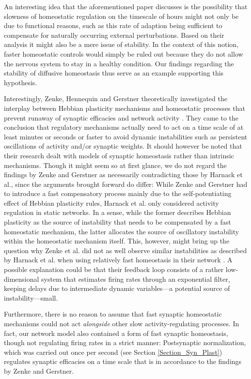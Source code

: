 \documentclass[10pt,a4paper]{article}
\begin{document}
An interesting idea that the aforementioned paper discusses is the possibility that slowness of homeostatic regulation on the timescale of hours might not only be due to functional reasons, such as this rate of adaption being sufficient to compensate for naturally occurring external perturbations. Based on their analysis it might also be a mere issue of stability. In the context of this notion, faster homeostatic controls would simply be ruled out because they do not allow the nervous system to stay in a healthy condition. Our findings regarding the stability of diffusive homeostasis thus serve as an example supporting this hypothesis.

Interestingly, Zenke, Hennequin and Gerstner theoretically investigated the interplay between Hebbian plasticity mechanisms and homeostatic processes that prevent runaway of synaptic efficacies and network activity \cite{Zenke_2013,Zenke_2017}. They came to the conclusion that regulatory mechanisms actually need to act on a time scale of at least minutes or seconds or faster to avoid dynamic instabilities such as persistent oscillations of activity and/or synaptic weights. It should however be noted that their research dealt with models of synaptic homeostasis rather than intrinsic mechanisms. Though it might seem so at first glance, we do not regard the findings by Zenke and Gerstner as necessarily contradicting those by Harnack et al., since the arguments brought forward do differ: While Zenke and Gerstner had to introduce a fast compensatory process mainly due to the self-potentiating effect of Hebbian plasticity rules, Harnack et al. only considered activity regulation in static networks. In a sense, while the former describes Hebbian plasticity as the source of instability that needs to be compensated by a fast homeostatic mechanism, the latter allocates the source of oscillatory instability within the homeostatic mechanism itself. This, however, might bring up the question why Zenke et al. did not as well observe similar instabilities as described by Harnack et al. when using relatively fast homeostasis in their network \cite{Zenke_2013}. A possible explanation could be that their feedback loop consists of a rather low-dimensional system that estimates firing rates through an exponential filter, keeping delays due to intermediate dynamic variables---a potential source of instability---small.

Furthermore, there is no reason to assume that fast synaptic homeostatic mechanisms could not act \emph{alongside} other slow activity-regulating processes. In fact, our network model also contained a form of fast synaptic homeostasis, though not regulating firing rates in a strict manner: Postsynaptic normalization, which was carried out once per second (see Section \ref{Section_Syn_Plast}) regulates synaptic efficacies on a time scale  that is in accordance to the findings by Zenke and Gerstner.
\end{document}
